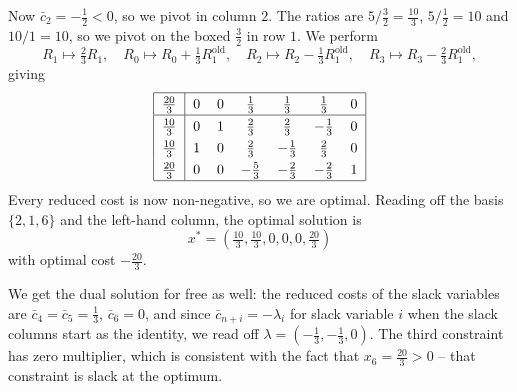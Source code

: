 \begin{example}
    Now $\bar c_2 = -\frac12 < 0$, so we pivot in column $2$. The ratios are $5/\frac32 = \frac{10}{3}$, $5/\frac12 = 10$ and $10/1 = 10$, so we pivot on the boxed $\frac32$ in row $1$. We perform
    $$
    R_1 \mapsto \tfrac23 R_1, \quad R_0 \mapsto R_0 + \tfrac13 R_1^{\text{old}}, \quad R_2 \mapsto R_2 - \tfrac13 R_1^{\text{old}}, \quad R_3 \mapsto R_3 - \tfrac23 R_1^{\text{old}},
    $$
    giving
    $$
    \arraycolsep=6pt\def\arraystretch{1.3}
    \begin{array}{|c|cccccc|}\hline
        \frac{20}{3} & 0 & 0 & \frac13 & \frac13 & \frac13 & 0\\\hline
        \frac{10}{3} & 0 & 1 & \frac23 & \frac23 & -\frac13 & 0\\
        \frac{10}{3} & 1 & 0 & \frac23 & -\frac13 & \frac23 & 0\\
        \frac{20}{3} & 0 & 0 & -\frac53 & -\frac23 & -\frac23 & 1\\\hline
    \end{array}
    $$
    Every reduced cost is now non-negative, so we are optimal. Reading off the basis $\{2,1,6\}$ and the left-hand column, the optimal solution is
    $$
    x^* = \left(\tfrac{10}{3}, \tfrac{10}{3}, 0, 0, 0, \tfrac{20}{3}\right)
    $$
    with optimal cost $-\frac{20}{3}$.

    We get the dual solution for free as well: the reduced costs of the slack variables are $\bar c_4 = \bar c_5 = \frac13$, $\bar c_6 = 0$, and since $\bar c_{n+i} = -\lambda_i$ for slack variable $i$ when the slack columns start as the identity, we read off $\lambda = (-\frac13, -\frac13, 0)$. The third constraint has zero multiplier, which is consistent with the fact that $x_6 = \frac{20}3 > 0$ -- that constraint is slack at the optimum.
\end{example}

